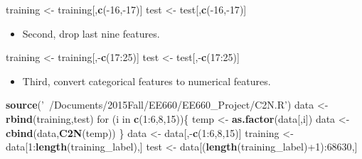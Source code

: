 \documentclass[]{article}
\newenvironment{Shaded}{\begin{snugshade}}{\end{snugshade}}
\newcommand{\KeywordTok}[1]{\textcolor[rgb]{0.13,0.29,0.53}{\textbf{{#1}}}}
\newcommand{\DecValTok}[1]{\textcolor[rgb]{0.00,0.00,0.81}{{#1}}}
\newcommand{\StringTok}[1]{\textcolor[rgb]{0.31,0.60,0.02}{{#1}}}
\newcommand{\NormalTok}[1]{{#1}}
\begin{document}
\begin{Shaded}
\begin{Highlighting}[]
\NormalTok{training <-}\StringTok{ }\NormalTok{training[,}\KeywordTok{c}\NormalTok{(-}\DecValTok{16}\NormalTok{,-}\DecValTok{17}\NormalTok{)]}
\NormalTok{test <-}\StringTok{ }\NormalTok{test[,}\KeywordTok{c}\NormalTok{(-}\DecValTok{16}\NormalTok{,-}\DecValTok{17}\NormalTok{)]}
\end{Highlighting}
\end{Shaded}

\begin{itemize}
\itemsep1pt\parskip0pt
\item
  Second, drop last nine features.
\end{itemize}

\begin{Shaded}
\begin{Highlighting}[]
\NormalTok{training <-}\StringTok{ }\NormalTok{training[,-}\KeywordTok{c}\NormalTok{(}\DecValTok{17}\NormalTok{:}\DecValTok{25}\NormalTok{)]}
\NormalTok{test <-}\StringTok{ }\NormalTok{test[,-}\KeywordTok{c}\NormalTok{(}\DecValTok{17}\NormalTok{:}\DecValTok{25}\NormalTok{)]}
\end{Highlighting}
\end{Shaded}

\begin{itemize}
\itemsep1pt\parskip0pt
\item
  Third, convert categorical features to numerical features.
\end{itemize}

\begin{Shaded}
\begin{Highlighting}[]
\KeywordTok{source}\NormalTok{(}\StringTok{'~/Documents/2015Fall/EE660/EE660_Project/C2N.R'}\NormalTok{)}
\NormalTok{data <-}\StringTok{ }\KeywordTok{rbind}\NormalTok{(training,test)}
\NormalTok{for (i in }\KeywordTok{c}\NormalTok{(}\DecValTok{1}\NormalTok{:}\DecValTok{6}\NormalTok{,}\DecValTok{8}\NormalTok{,}\DecValTok{15}\NormalTok{))\{}
    \NormalTok{temp <-}\StringTok{ }\KeywordTok{as.factor}\NormalTok{(data[,i])}
    \NormalTok{data <-}\StringTok{ }\KeywordTok{cbind}\NormalTok{(data,}\KeywordTok{C2N}\NormalTok{(temp))}
\NormalTok{\}}
\NormalTok{data <-}\StringTok{ }\NormalTok{data[,-}\KeywordTok{c}\NormalTok{(}\DecValTok{1}\NormalTok{:}\DecValTok{6}\NormalTok{,}\DecValTok{8}\NormalTok{,}\DecValTok{15}\NormalTok{)]}
\NormalTok{training <-}\StringTok{ }\NormalTok{data[}\DecValTok{1}\NormalTok{:}\KeywordTok{length}\NormalTok{(training_label),]}
\NormalTok{test <-}\StringTok{ }\NormalTok{data[(}\KeywordTok{length}\NormalTok{(training_label)+}\DecValTok{1}\NormalTok{):}\DecValTok{68630}\NormalTok{,]}
\end{Highlighting}
\end{Shaded}
\end{document}
